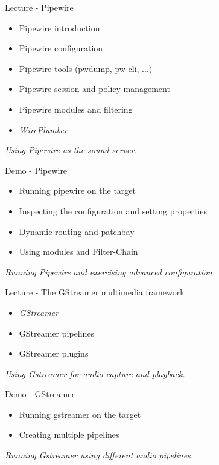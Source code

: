 \documentclass[a4paper,12pt,obeyspaces,spaces,hyphens]{article}
\begin{document}
\feagendatwocolumn
{Lecture - Pipewire}
{
  \begin{itemize}
  \item Pipewire introduction
  \item Pipewire configuration
  \item Pipewire tools (pwdump, pw-cli, ...)
  \item Pipewire session and policy management
  \item Pipewire modules and filtering
  \item {\em WirePlumber}
  \end{itemize}
  \vspace{0.5em}
  {\em Using Pipewire as the sound server.}
}
{Demo - Pipewire}
{
  \begin{itemize}
  \item Running pipewire on the target
  \item Inspecting the configuration and setting properties
  \item Dynamic routing and patchbay
  \item Using modules and Filter-Chain
  \end{itemize}
  \vspace{0.5em}
  {\em Running Pipewire and exercising advanced configuration.}
}

\feagendatwocolumn
{Lecture - The GStreamer multimedia framework}
{
  \begin{itemize}
  \item {\em GStreamer}
  \item GStreamer pipelines
  \item GStreamer plugins
  \end{itemize}
  \vspace{0.5em}
  {\em Using Gstreamer for audio capture and playback.}
}
{Demo - GStreamer}
{
  \begin{itemize}
  \item Running gstreamer on the target
  \item Creating multiple pipelines
  \end{itemize}
  \vspace{0.5em}
  {\em Running Gstreamer using different audio pipelines.}
}
\end{document}
